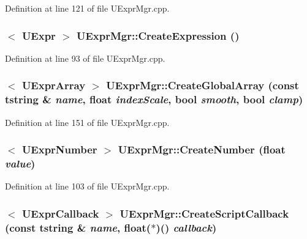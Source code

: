 Definition at line 121 of file UExprMgr.cpp.\hypertarget{class_u_expr_mgr_1fe471416a27b2dda3856c14137b3880}{
\subsubsection[{CreateExpression}]{$<$ {\bf UExpr} $>$ UExprMgr::CreateExpression ()}}
\label{class_u_expr_mgr_1fe471416a27b2dda3856c14137b3880}




Definition at line 93 of file UExprMgr.cpp.\hypertarget{class_u_expr_mgr_c32f4bc739345cc34ba814886b342d47}{
\subsubsection[{CreateGlobalArray}]{$<$ {\bf UExprArray} $>$ UExprMgr::CreateGlobalArray (const {\bf tstring} \& {\em name}, \/  float {\em indexScale}, \/  bool {\em smooth}, \/  bool {\em clamp})}}
\label{class_u_expr_mgr_c32f4bc739345cc34ba814886b342d47}




Definition at line 151 of file UExprMgr.cpp.\hypertarget{class_u_expr_mgr_a69ed663f2ce4467182f40877cff51fe}{
\subsubsection[{CreateNumber}]{$<$ {\bf UExprNumber} $>$ UExprMgr::CreateNumber (float {\em value})}}
\label{class_u_expr_mgr_a69ed663f2ce4467182f40877cff51fe}




Definition at line 103 of file UExprMgr.cpp.\hypertarget{class_u_expr_mgr_7a3da85c7e2f1809494e029e292dda23}{
\subsubsection[{CreateScriptCallback}]{$<$ {\bf UExprCallback} $>$ UExprMgr::CreateScriptCallback (const {\bf tstring} \& {\em name}, \/  float($\ast$)() {\em callback})}}
\label{class_u_expr_mgr_7a3da85c7e2f1809494e029e292dda23}




